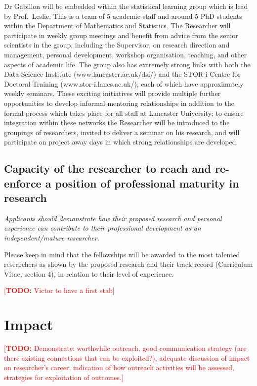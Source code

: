 \documentclass[a4paper,11pt]{article}
\newcommand{\TODO}[1]{{\textcolor{red}{[\textbf{TODO:} #1]}}}
\begin{document}
Dr Gabillon will be embedded within the statistical learning group which is lead by Prof.\ Leslie.  This is a team of 5 academic staff and around 5 PhD students within the Department of Mathematics and Statistics.  The Researcher will participate in weekly group meetings and benefit from advice from the senior scientists in the group, including the Supervisor, on research direction and management, personal development, workshop organisation, teaching, and other aspects of academic life.  The group also has extremely strong links with both the Data Science Institute (www.lancaster.ac.uk/dsi/) and the STOR-i Centre for Doctoral Training (www.stor-i.lancs.ac.uk/), each of which have approximately weekly seminars.  These exciting initiatives will provide multiple further opportunities to develop informal mentoring relationships in addition to the formal process which takes place for all staff at Lancaster University; to ensure integration within these networks the Researcher will be introduced to the groupings of researchers, invited to deliver a seminar on his research, and will participate on project away days in which strong relationships are developed.


\subsection{Capacity of the researcher to reach and re-enforce a position of professional maturity in research}
\label{sec:maturity}

{\em
Applicants should demonstrate how their proposed research and personal experience can contribute to their professional development as an independent/mature researcher.

Please keep in mind that the fellowships will be awarded to the most talented researchers as shown by the proposed research and their track record (Curriculum Vitae, section 4), in relation to their level of experience.
}

\TODO{Victor to have a first stab}

\section{Impact}
\label{sec:impact}

\TODO{Demonstrate: worthwhile outreach, good communication strategy (are there existing connections that can be exploited?), adequate discussion of impact on researcher's career, indication of how outreach activities will be assessed, strategies for exploitation of outcomes.}
\end{document}
